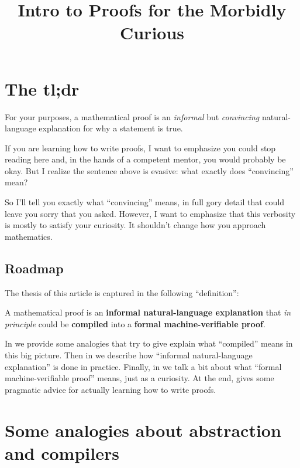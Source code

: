 \documentclass[11pt]{scrartcl}
\begin{document}
\title{Intro to Proofs for the Morbidly Curious}
\maketitle

\tableofcontents

\section{The tl;dr}
\label{sec:tldr}

For your purposes, a \alert{mathematical proof} is an
\emph{informal} but \emph{convincing} natural-language explanation
for why a statement is true.

If you are learning how to write proofs,
I want to emphasize \alert{you could stop reading here} and,
in the hands of a competent mentor, you would probably be okay.
But I realize the sentence above is evasive:
what exactly does ``convincing'' mean?

So I'll tell you exactly what ``convincing'' means,
in full gory detail that could leave you sorry that you asked.
However, I want to emphasize that
\alert{this verbosity is mostly to satisfy your curiosity}.
It shouldn't change how you approach mathematics.

\subsection{Roadmap}
The thesis of this article is captured in the following ``definition'':
\begin{definition}
  A \alert{mathematical proof} is an
  \textbf{informal natural-language explanation}
  that \emph{in principle} could be \textbf{compiled} into a
  \textbf{formal machine-verifiable proof}.
\end{definition}
In  we provide some analogies that try to give
explain what ``compiled'' means in this big picture.
Then in  we describe how
``informal natural-language explanation'' is done in practice.
Finally, in  we talk a bit about
what ``formal machine-verifiable proof'' means, just as a curiosity.
At the end,  gives some pragmatic
advice for actually learning how to write proofs.

\section{Some analogies about abstraction and compilers}
\label{sec:analogy}
\end{document}
